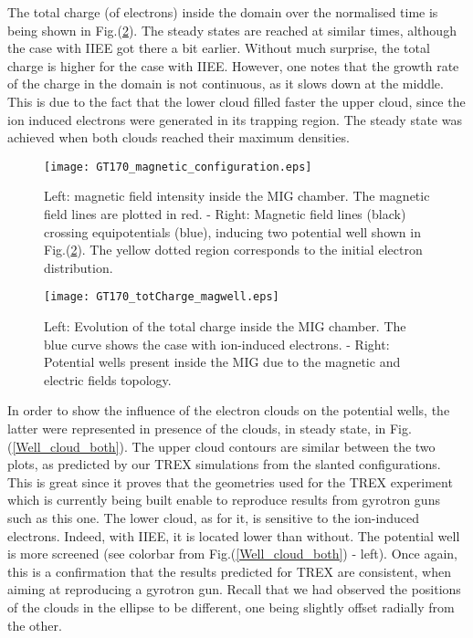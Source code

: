 The total charge (of electrons) inside the domain over the normalised time is being shown in Fig.(\ref{Totcharge+magwell}). The steady states are reached at similar times, although the case with IIEE got there a bit earlier. Without much surprise, the total charge is higher for the case with IIEE. However, one notes that the growth rate of the charge in the domain is not continuous, as it slows down at the middle. This is due to the fact that the lower cloud filled faster the upper cloud, since the ion induced electrons were generated in its trapping region. The steady state was achieved when both clouds  reached their maximum densities. 

\begin{figure}[h!]
\centering
	\texttt{[image: GT170\_magnetic\_configuration.eps]}
	\caption{\label{magnetic_configuration} Left: magnetic field intensity inside the MIG chamber. The magnetic field lines are plotted in red. -  Right: Magnetic field lines (black) crossing equipotentials (blue), inducing two potential well shown in Fig.(\ref{Totcharge+magwell}). The yellow dotted region corresponds to the initial electron distribution.}
\end{figure}

\begin{figure}[h!]
\centering
	\texttt{[image: GT170\_totCharge\_magwell.eps]}
	\caption{\label{Totcharge+magwell} Left: Evolution of the total charge inside the MIG chamber. The blue curve shows the case with ion-induced electrons. - Right: Potential wells present inside the MIG due to the magnetic and electric fields topology.}
\end{figure}


In order to show the influence of the electron clouds on the potential wells, the latter were represented in presence of the clouds, in steady state, in Fig.(\ref{Well_cloud_both}). The upper cloud contours are similar between the two plots, as predicted by our TREX simulations from the slanted configurations. This is great since it proves that the geometries used for the TREX experiment which is currently being built enable to reproduce results from gyrotron guns such as this one. The lower cloud, as for it, is sensitive to the ion-induced electrons. Indeed, with IIEE, it is located lower than without. The potential well is more screened (see colorbar from Fig.(\ref{Well_cloud_both}) - left). Once again, this is a confirmation that the results predicted for TREX are consistent, when aiming at reproducing a gyrotron gun. Recall that we had observed the positions of the clouds in the ellipse to be different, one being slightly offset radially from the other.\\

